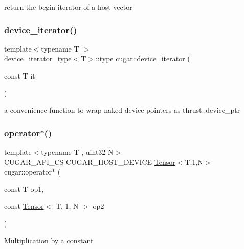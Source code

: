 return the begin iterator of a host vector \mbox{\label{namespacecugar_a0e75b2d03baebc99db6b620e0c962b5c}} 
\subsubsection{\texorpdfstring{device\+\_\+iterator()}{device\_iterator()}}
{\footnotesize\ttfamily template$<$typename T $>$ \\
\hyperlink{structcugar_1_1device__iterator__type}{device\+\_\+iterator\+\_\+type}$<$T$>$\+::type cugar\+::device\+\_\+iterator (\begin{DoxyParamCaption}\item[{const T}]{it }\end{DoxyParamCaption})}

a convenience function to wrap naked device pointers as thrust\+::device\+\_\+ptr \mbox{\label{namespacecugar_a512b8bd8923b7f7e958aee854ff19d70}} 
\subsubsection{\texorpdfstring{operator$\ast$()}{operator*()}\hspace{0.1cm}{\footnotesize\ttfamily [1/6]}}
{\footnotesize\ttfamily template$<$typename T , uint32 N$>$ \\
C\+U\+G\+A\+R\+\_\+\+A\+P\+I\+\_\+\+CS C\+U\+G\+A\+R\+\_\+\+H\+O\+S\+T\+\_\+\+D\+E\+V\+I\+CE \hyperlink{structcugar_1_1_tensor}{Tensor}$<$T,1,N$>$ cugar\+::operator$\ast$ (\begin{DoxyParamCaption}\item[{const T}]{op1,  }\item[{const \hyperlink{structcugar_1_1_tensor}{Tensor}$<$ T, 1, N $>$}]{op2 }\end{DoxyParamCaption})}

Multiplication by a constant \mbox{\label{namespacecugar_a269c60a8983b2a19b12b055ec1d3ce53}} 
